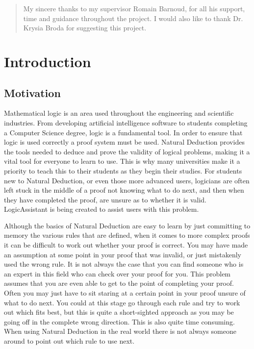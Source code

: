 \vspace*{\fill}

\pagebreak
\vspace*{\fill}
\afterpage{\blankpage}
\renewcommand{\abstractname}{\large Acknowledgements}

\begin{abstract}

	\noindent
	My sincere thanks to my supervisor Romain Barnoud, for all his support, time and guidance throughout the project. I would also like to thank Dr. Krysia Broda for suggesting this project.
\end{abstract}
\vspace*{\fill}

\pagebreak

\tableofcontents
\pagebreak



\section{Introduction}

\subsection{Motivation}

Mathematical logic is an area used throughout the engineering and scientific industries. From developing artificial intelligence software to students completing a Computer Science degree, logic is a fundamental tool. In order to ensure that logic is used correctly a proof system must be used. Natural Deduction provides the tools needed to deduce and prove the validity of logical problems, making it a vital tool for everyone to learn to use. This is why many universities make it a priority to teach this to their students as they begin their studies. For students new to Natural Deduction, or even those more advanced users, logicians are often left stuck in the middle of a proof not knowing what to do next, and then when they have completed the proof, are unsure as to whether it is valid. LogicAssistant is being created to assist users with this problem.

Although the basics of Natural Deduction are easy to learn by just committing to memory the various rules that are defined, when it comes to more complex proofs it can be difficult to work out whether your proof is correct. You may have made an assumption at some point in your proof that was invalid, or just mistakenly used the wrong rule. It is not always the case that you can find someone who is an expert in this field who can check over your proof for you. This problem assumes that you are even able to get to the point of completing your proof. Often you may just have to sit staring at a certain point in your proof unsure of what to do next. You could at this stage go through each rule and try to work out which fits best, but this is quite a short-sighted approach as you may be going off in the complete wrong direction. This is also quite time consuming. When using Natural Deduction in the real world there is not always someone around to point out which rule to use next. 

